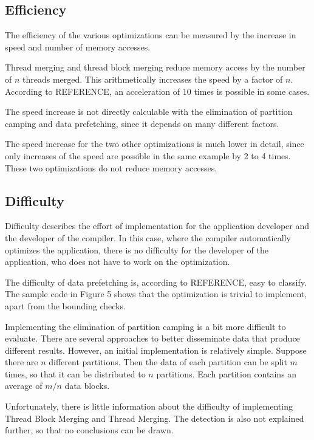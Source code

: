 \documentclass[conference]{IEEEtran}
\begin{document}
	\subsection{Efficiency}
		The efficiency of the various optimizations can be measured by the increase in speed and number of memory accesses.
		
		Thread merging and thread block merging reduce memory access by the number of $n$ threads merged. This arithmetically increases the speed by a factor of $n$. According to REFERENCE, an acceleration of 10 times is possible in some cases.
		
		The speed increase is not directly calculable with the elimination of partition camping and data prefetching, since it depends on many different factors.
		
		The speed increase for the two other optimizations is much lower in detail, since only increases of the speed are possible in the same example by 2 to 4 times. These two optimizations do not reduce memory accesses.
		
		
	\subsection{Difficulty}
		
		Difficulty describes the effort of implementation for the application developer and the developer of the compiler. In this case, where the compiler automatically optimizes the application, there is no difficulty for the developer of the application, who does not have to work on the optimization.

		The difficulty of data prefetching is, according to REFERENCE, easy to classify. The sample code in Figure 5 shows that the optimization is trivial to implement, apart from the bounding checks.
		
		Implementing the elimination of partition camping is a bit more difficult to evaluate. There are several approaches to better disseminate data that produce different results. However, an initial implementation is relatively simple. 
		Suppose there are $n$ different partitions. Then the data of each partition can be split $m$ times, so that it can be distributed to $n$ partitions. Each partition contains an average of $m/n$ data blocks.
		
		
		Unfortunately, there is little information about the difficulty of implementing Thread Block Merging and Thread Merging. The detection is also not explained further, so that no conclusions can be drawn.
		
\end{document}
